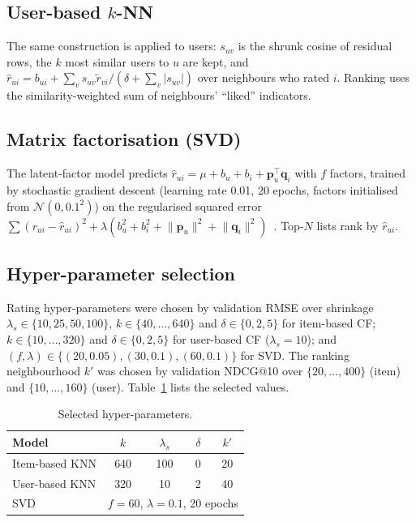 \documentclass[conference]{IEEEtran}
\begin{document}
\subsection{User-based $k$-NN}
The same construction is applied to users: $s_{uv}$ is the shrunk cosine of residual rows, the $k$ most similar users to $u$ are kept, and $\hat r_{ui}=b_{ui}+\sum_{v}s_{uv}\tilde r_{vi}/(\delta+\sum_{v}|s_{uv}|)$ over neighbours who rated $i$. Ranking uses the similarity-weighted sum of neighbours' ``liked'' indicators.

\subsection{Matrix factorisation (SVD)}
The latent-factor model predicts $\hat r_{ui}=\mu+b_u+b_i+\mathbf p_u^{\top}\mathbf q_i$ with $f$ factors, trained by stochastic gradient descent (learning rate 0.01, 20 epochs, factors initialised from $\mathcal N(0,0.1^2)$) on the regularised squared error $\sum(r_{ui}-\hat r_{ui})^2+\lambda(b_u^2+b_i^2+\lVert\mathbf p_u\rVert^2+\lVert\mathbf q_i\rVert^2)$~\cite{koren2009}. Top-$N$ lists rank by $\hat r_{ui}$.

\subsection{Hyper-parameter selection}
Rating hyper-parameters were chosen by validation RMSE over shrinkage $\lambda_s\in\{10,25,50,100\}$, $k\in\{40,\dots,640\}$ and $\delta\in\{0,2,5\}$ for item-based CF; $k\in\{10,\dots,320\}$ and $\delta\in\{0,2,5\}$ for user-based CF ($\lambda_s{=}10$); and $(f,\lambda)\in\{(20,0.05),(30,0.1),(60,0.1)\}$ for SVD. The ranking neighbourhood $k'$ was chosen by validation NDCG@10 over $\{20,\dots,400\}$ (item) and $\{10,\dots,160\}$ (user). Table~\ref{tab:hyper} lists the selected values.

\begin{table}[t]
\centering
\caption{Selected hyper-parameters.}
\label{tab:hyper}
\footnotesize
\begin{tabular}{lcccc}
\toprule
Model & $k$ & $\lambda_s$ & $\delta$ & $k'$ \\
\midrule
Item-based KNN & 640 & 100 & 0 & 20 \\
User-based KNN & 320 & 10 & 2 & 40 \\
SVD & \multicolumn{4}{c}{$f=60$, $\lambda=0.1$, 20 epochs} \\
\bottomrule
\end{tabular}
\end{table}
\end{document}
